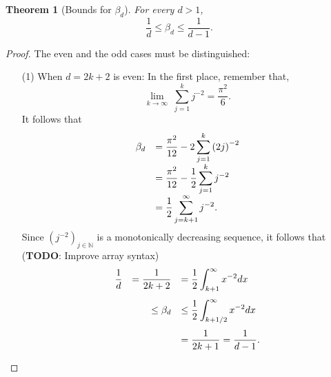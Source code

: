 \documentclass[12pt]{exam}
\def\N{\ensuremath{\mathbb{N}}}
\newtheorem{theorem}{Theorem}[section]
\theoremstyle{remark}
\begin{document}
\begin{theorem}[Bounds for $\beta_d$]\label{ade:T1}
  For every $d > 1$,
  \[ \frac{1}{d} \leq \beta_d \leq \frac{1}{d-1}. \] 
\end{theorem}

\begin{proof}
  The even and the odd cases must be distinguished:
  \begin{enumerate}
    \item[(1)] When $d = 2k+2$ is even:
    In the first place, remember that,
    \[ \lim_{k\to\infty}\; \sum_{j = 1}^{k} j^{-2} = \frac{\pi^2}{6}.\] 
    It follows that
    \[\everymath{\displaystyle}
      \begin{array}{rl}
        \beta_d & = \frac{\pi^2}{12} - 2 \sum_{j = 1}^{k} {(2j)}^{-2}\\
        & = \frac{\pi^2}{12} - \frac{1}{2} \sum_{j = 1}^{k} j^{-2}\\
        & = \frac{1}{2} \sum_{j = k+1}^{\infty} j^{-2}.
      \end{array}      
     \]
    Since ${(j^{-2})}_{j \in \N}$ is a monotonically decreasing sequence, it follows that (\textbf{TODO}: Improve array syntax)
    \[\everymath{\displaystyle} 
      \begin{array}{rrl}
        \frac{1}{d}   & = \frac{1}{2k+2}  & = \frac{1}{2} \int_{k+1}^{\infty}x^{-2} dx\\[5mm]
      & \leq \beta_d  & \leq  \frac{1}{2} \int_{k+1/2}^{\infty}x^{-2} dx\\[5mm]
      & & = \frac{1}{2k+1} = \frac{1}{d-1}.
    \end{array}  \] 


\end{enumerate}
\end{proof}
\end{document}
